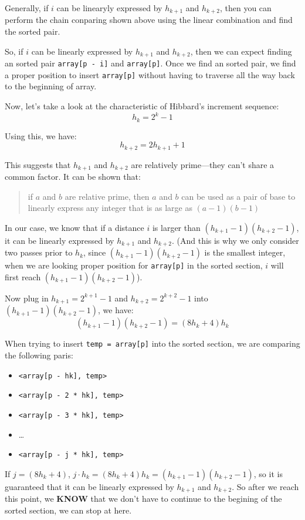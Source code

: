 \documentclass[12pt]{book}
\begin{document}
Generally, if \(i\) can be linearyly expressed by \(h_{k + 1}\) and \(h_{k + 2}\), then you can perform the chain conparing shown above using the linear combination and find the sorted pair.

So, if \(i\) can be linearly expressed by \(h_{k + 1}\) and \(h_{k + 2}\), then we can expect finding an sorted pair \texttt{array[p - i]} and \texttt{array[p]}. Once we find an sorted pair, we find a proper position to insert \texttt{array[p]} without having to traverse all the way back to the beginning of array.

Now, let's take a look at the characteristic of Hibbard's increment sequence:
\[
h_k = 2^k - 1
\]

Using this, we have:
\[
h_{k + 2} = 2h_{k + 1} + 1
\]

This suggests that \(h_{k + 1}\) and \(h_{k + 2}\) are relatively prime---they can't share a common factor. It can be shown that:
\begin{quote}
if \(a\) and \(b\) are relative prime, then \(a\) and \(b\) can be used as a pair of base to linearly express any integer that is as large as \((a - 1)(b - 1)\)
\end{quote}

In our case, we know that if a distance \(i\) is larger than \((h_{k + 1} - 1)(h_{k + 2} - 1)\), it can be linearly expressed by \(h_{k + 1}\) and \(h_{k + 2}\). (And this is why we only consider two passes prior to \(h_k\), since \((h_{k + 1} - 1)(h_{k + 2} - 1)\) is the smallest integer, when we are looking proper position for \texttt{array[p]} in the sorted section, \(i\) will first reach \((h_{k + 1} - 1)(h_{k + 2} - 1)\)).

Now plug in \(h_{k + 1} = 2^{k + 1} - 1\) and \(h_{k + 2} = 2^{k + 2} - 1\) into \((h_{k + 1} - 1)(h_{k + 2} - 1)\), we have:
\[
(h_{k + 1} - 1)(h_{k + 2} - 1) = (8h_k + 4)h_k
\]

When trying to insert \texttt{temp = array[p]} into the sorted section, we are comparing the following paris:
\begin{itemize}
\item \texttt{<array[p - hk], temp>}
\item \texttt{<array[p - 2 * hk], temp>}
\item \texttt{<array[p - 3 * hk], temp>}
\item \ldots{}
\item \texttt{<array[p - j * hk], temp>}
\end{itemize}

If \(j = (8h_k + 4)\), \(j \cdot h_k = (8h_k + 4) h_k = (h_{k + 1} - 1)(h_{k + 2} - 1)\), so it is guaranteed that it can be linearly expressed by \(h_{k + 1}\) and \(h_{k + 2}\). So after we reach this point, we \textbf{KNOW} that we don't have to continue to the begining of the sorted section, we can stop at here.
\end{document}
